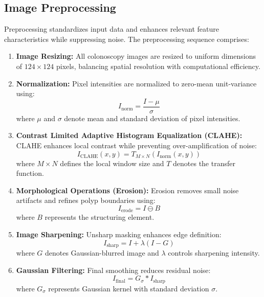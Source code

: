 \documentclass[11pt,a4paper]{article}
\begin{document}
\subsection{Image Preprocessing}

Preprocessing standardizes input data and enhances relevant feature characteristics while suppressing noise. The preprocessing sequence comprises:

\begin{enumerate}
\item \textbf{Image Resizing:} All colonoscopy images are resized to uniform dimensions of $124 \times 124$ pixels, balancing spatial resolution with computational efficiency.

\item \textbf{Normalization:} Pixel intensities are normalized to zero-mean unit-variance using:
\begin{equation}
I_{\text{norm}} = \frac{I - \mu}{\sigma}
\end{equation}
where $\mu$ and $\sigma$ denote mean and standard deviation of pixel intensities.

\item \textbf{Contrast Limited Adaptive Histogram Equalization (CLAHE):} CLAHE enhances local contrast while preventing over-amplification of noise:
\begin{equation}
I_{\text{CLAHE}}(x,y) = T_{M \times N}(I_{\text{norm}}(x,y))
\end{equation}
where $M \times N$ defines the local window size and $T$ denotes the transfer function.

\item \textbf{Morphological Operations (Erosion):} Erosion removes small noise artifacts and refines polyp boundaries using:
\begin{equation}
I_{\text{erode}} = I \ominus B
\end{equation}
where $B$ represents the structuring element.

\item \textbf{Image Sharpening:} Unsharp masking enhances edge definition:
\begin{equation}
I_{\text{sharp}} = I + \lambda(I - G)
\end{equation}
where $G$ denotes Gaussian-blurred image and $\lambda$ controls sharpening intensity.

\item \textbf{Gaussian Filtering:} Final smoothing reduces residual noise:
\begin{equation}
I_{\text{final}} = G_{\sigma} * I_{\text{sharp}}
\end{equation}
where $G_{\sigma}$ represents Gaussian kernel with standard deviation $\sigma$.
\end{enumerate}
\end{document}
